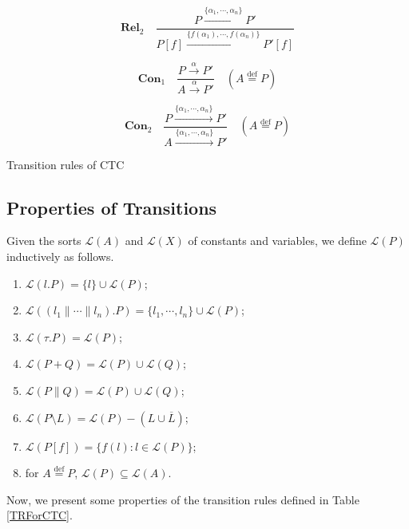 \begin{definition}[Semantics]
\begin{center}
\begin{table}
        \[\textbf{Rel}_2\quad \frac{P\xrightarrow{\{\alpha_1,\cdots,\alpha_n\}}P'}{P[f]\xrightarrow{\{f(\alpha_1),\cdots,f(\alpha_n)\}}P'[f]}\]

        \[\textbf{Con}_1\quad\frac{P\xrightarrow{\alpha}P'}{A\xrightarrow{\alpha}P'}\quad (A\overset{\text{def}}{=}P)\]

        \[\textbf{Con}_2\quad\frac{P\xrightarrow{\{\alpha_1,\cdots,\alpha_n\}}P'}{A\xrightarrow{\{\alpha_1,\cdots,\alpha_n\}}P'}\quad (A\overset{\text{def}}{=}P)\]

        \caption{Transition rules of CTC}
        \label{TRForCTC}
    \end{table}
\end{center}
\end{definition}

\subsection{Properties of Transitions}

\begin{definition}[Sorts]\label{sorts}
Given the sorts $\mathcal{L}(A)$ and $\mathcal{L}(X)$ of constants and variables, we define $\mathcal{L}(P)$ inductively as follows.

\begin{enumerate}
  \item $\mathcal{L}(l.P)=\{l\}\cup\mathcal{L}(P)$;
  \item $\mathcal{L}((l_1\parallel \cdots\parallel l_n).P)=\{l_1,\cdots,l_n\}\cup\mathcal{L}(P)$;
  \item $\mathcal{L}(\tau.P)=\mathcal{L}(P)$;
  \item $\mathcal{L}(P+Q)=\mathcal{L}(P)\cup\mathcal{L}(Q)$;
  \item $\mathcal{L}(P\parallel Q)=\mathcal{L}(P)\cup\mathcal{L}(Q)$;
  \item $\mathcal{L}(P\setminus L)=\mathcal{L}(P)-(L\cup\overline{L})$;
  \item $\mathcal{L}(P[f])=\{f(l):l\in\mathcal{L}(P)\}$;
  \item for $A\overset{\text{def}}{=}P$, $\mathcal{L}(P)\subseteq\mathcal{L}(A)$.
\end{enumerate}
\end{definition}

Now, we present some properties of the transition rules defined in Table \ref{TRForCTC}.

